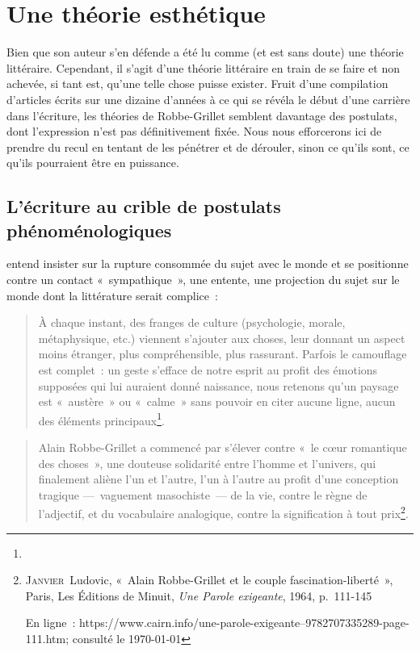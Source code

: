 \newpage

\section{Une théorie esthétique}

Bien que son auteur s'en défende \punr{} a été lu comme (et est sans doute) une théorie littéraire. Cependant, il s'agit d'une théorie littéraire en train de se faire et non achevée, si tant est, qu'une telle chose puisse exister. Fruit d'une compilation d'articles écrits sur une dizaine d'années à ce qui se révéla le début d'une carrière dans l'écriture, les théories de Robbe-Grillet semblent davantage des postulats, dont l'expression n'est pas définitivement fixée. Nous nous efforcerons ici de prendre du recul en tentant de les pénétrer et de dérouler, sinon ce qu'ils sont, ce qu'ils pourraient être en puissance.

\subsection{L'écriture au crible de postulats phénoménologiques}
\label{3phéno}

\punr{} entend insister sur la rupture consommée du sujet avec le monde et se positionne contre un contact «~sympathique~», une entente, une projection du sujet sur le monde dont la littérature serait complice~:
\begin{quote}
    À chaque instant, des franges de culture (psychologie, morale, métaphysique, etc.) viennent s’ajouter aux choses, leur donnant un aspect moins étranger, plus compréhensible, plus rassurant. Parfois le camouflage est complet~: un geste s’efface de notre esprit au profit des émotions supposées qui lui auraient donné naissance, nous retenons qu’un paysage est «~austère~» ou «~calme~» sans pouvoir en citer aucune ligne, aucun des éléments principaux\footnote{}.
\end{quote}

\begin{quote}
    Alain Robbe-Grillet a commencé par s’élever contre «~le cœur romantique des choses~», une douteuse solidarité entre l’homme et l’univers, qui finalement aliène l’un et l’autre, l’un à l’autre au profit d’une conception tragique —~vaguement masochiste~— de la vie, contre le règne de l’adjectif, et du vocabulaire analogique, contre la signification à tout prix\footnote{\textsc{Janvier}~Ludovic, «~Alain Robbe-Grillet et le couple fascination-liberté~», Paris, Les Éditions de Minuit, \textit{Une Parole exigeante}, 1964, p.~111-145

En ligne~: https://www.cairn.info/une-parole-exigeante--9782707335289-page-111.htm; consulté le \today}.
\end{quote}

